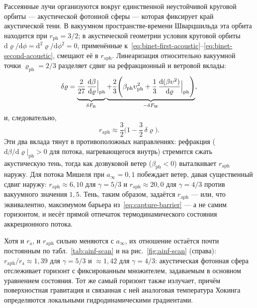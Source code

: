 \documentclass[12pt,a4paper,preprint]{elsarticle}
\begin{document}
            Рассеянные лучи организуются вокруг единственной неустойчивой круговой орбиты --- акустической фотонной сферы --- которая фиксирует край акустической тени. В вакуумном пространстве-времени Шварцшильда эта орбита находится при $r_{\mathrm{ph}}=3/2$; в акустической геометрии условия круговой орбиты $\mathrm{d}\varrho/\mathrm{d}\phi=\mathrm{d}^{2}\varrho/\mathrm{d}\phi^{2}=0$, применённые к~\eqref{eq:binet-first-acoustic}--\eqref{eq:binet-second-acoustic}, смещают её в $r_{\mathrm{aph}}$. Линеаризация относительно вакуумной точки $\varrho_{\mathrm{ph}}=2/3$ разделяет сдвиг на рефракционный и ветровой вклады:
            \begin{equation}
                \delta\varrho = \underbrace{\vphantom{\Biggl( \beta_{\mathrm{ph}}\upsilon^{2}_{\mathrm{ph}} + \frac{1}{3}\,\frac{\mathrm{d}(\beta\upsilon^{2})}{\mathrm{d}\varrho}\Big|_{\mathrm{ph}} \Biggr)}\frac{2}{27}\,\frac{\mathrm{d}\beta}{\mathrm{d}\varrho}\Big|_{\mathrm{ph}}}_{\delta F_{\mathrm{R}}} \underbrace{+ \frac{2}{3}\Biggl( \beta_{\mathrm{ph}}\upsilon^{2}_{\mathrm{ph}} + \frac{1}{3}\,\frac{\mathrm{d}(\beta\upsilon^{2})}{\mathrm{d}\varrho}\Big|_{\mathrm{ph}} \Biggr)}_{-\delta F_{\mathrm{W}}} ,
                \label{eq:acoustic-photon-sphere-delta}
            \end{equation}
            и, следовательно,
            \begin{equation}
                r_{\mathrm{aph}} \approx \frac{3}{2}\Biggl(1 - \frac{3}{2}\,\delta\varrho\Biggr) .
                \label{eq:raph-from-delta}
            \end{equation}
            Эти два вклада тянут в противоположных направлениях: рефракция ($\mathrm{d}\beta/\mathrm{d}\varrho|_{\mathrm{ph}}>0$ для потока, нагревающегося внутрь) стремится сжать акустическую тень, тогда как дозвуковой ветер ($\beta_{\mathrm{ph}}<0$) выталкивает $r_{\mathrm{aph}}$ наружу. Для потока Мишеля при $a_{\infty}=0{,}1$ побеждает ветер, давая существенный сдвиг наружу: $r_{\mathrm{aph}}\approx 6{,}10$ для $\gamma=5/3$ и $r_{\mathrm{aph}}\approx 20{,}0$ для $\gamma=4/3$ против вакуумного значения $1{,}5$. Тень, таким образом, задаётся $r_{\mathrm{aph}}$ --- или, что эквивалентно, максимумом барьера из~\eqref{eq:capture-barrier} --- а не самим горизонтом, и несёт прямой отпечаток термодинамического состояния аккреционного потока.

            Хотя и $r_{\mathrm{a}}$, и $r_{\mathrm{aph}}$ сильно меняются с $a_{\infty}$, их отношение остаётся почти постоянным по табл.~\ref{tab:ainf-scan} и на рис.~\ref{fig:ainf-scan} (справа): $r_{\mathrm{aph}}/r_{\mathrm{a}}\approx 1{,}39$ для $\gamma=5/3$ и $\approx 1{,}42$ для $\gamma=4/3$: акустическая фотонная сфера отслеживает горизонт с фиксированным множителем, задаваемым в основном уравнением состояния. Тот же самый горизонт также излучает, причём поверхностная гравитация и связанная с ней аналоговая температура Хокинга определяются локальными гидродинамическими градиентами.
\end{document}
